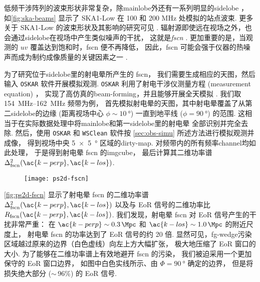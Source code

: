 低频干涉阵列的波束形状非常复杂，除\ac{mainlobe}外还有一系列明显的\ac{sidelobe}
\cite{noordam2004,wijnholds2010}，
如\autoref{fig:ska-beams} 显示了 SKA1-Low 在 100 和 200 MHz 处模拟的站点波束.
更多关于 SKA1-Low 的波束形状及其影响的研究可见 .
辐射源即使远在视场之外，也会通过\ac{sidelobe}在视场中产生类似噪声的干扰，
这就是\emph{\acf{fscn}} \cite{smirnov2012}.
更加重要的是，当观测的 $uv$ 覆盖达到饱和时，\ac{fscn} 便不再降低，
因此，\ac{fscn} 可能会强于仪器的热噪声而成为制约成像质量的关键因素之一 \cite{mort2017}.

为了研究位于\ac{sidelobe}里的射电晕所产生的 \ac{fscn}，
我们需要生成相应的天图，然后输入 \texttt{OSKAR} 软件开展模拟观测.
\texttt{OSKAR} 利用了射电干涉仪测量方程 (measurement equation) \cite{smirnov2011}，
实现了高仿真的\ac{beam-forming}，并且能够开展全天模拟 \cite{mort2010}.
我们取 \SIrange{154}{162}{\MHz} 频带为例，
首先模拟射电晕的天图，其中射电晕覆盖了从第二\ac{sidelobe}的边缘
(距离视场中心 $\phi \sim \SI{10}{\degree}$)
一直到地平线 ($\phi = \SI{90}{\degree}$) 的范围.
这相当于在实际数据处理中将\ac{mainlobe}和第一\ac{sidelobe}里的射电晕
全部识别并完全去除.
然后，使用 \texttt{OSKAR} 和 \texttt{WSClean} 软件按
\autoref{sec:obs-simu} 所述方法进行模拟观测并成像，
得到视场中央 \SI{5 x 5}{\degree} 区域的\ac{dirty-map}.
对频带内的所有频率\ac{channel}均如此处理，
于是得到射电晕 \ac{fscn} 的\ac{imgcube}，
最后计算其二维功率谱 $\Delta^2_{\R{fscn}}(\ac{k-perp}, \ac{k-los})$.

\begin{figure}[htp]
  \centering
  \texttt{[image: ps2d-fscn]}
  \label{fig:ps2d-fscn}
\end{figure}

\autoref{fig:ps2d-fscn} 显示了射电晕 \ac{fscn}
的二维功率谱 $\Delta^2_{\R{fscn}}(\ac{k-perp}, \ac{k-los})$
以及与 EoR 信号的二维功率比 $R_{\R{fscn}}(\ac{k-perp}, \ac{k-los})$.
我们发现，射电晕 \ac{fscn} 对 EoR 信号产生的干扰非常严重：
在 $\ac{k-perp} \sim \SI{0.3}{\per\Mpc}$ 
和 $\ac{k-los} \sim \SI{1.0}{\per\Mpc}$ 的附近尺度上，
射电晕 \ac{fscn} 的功率达到了 EoR 信号的约 20 倍.
显然可见，\ac{fg-wedge}污染区域越过原来的边界（白色虚线）向左上方大幅扩张，
极大地压缩了 EoR 窗口的大小.
为了能够在二维功率谱上有效地避开 \ac{fscn} 的污染，
我们被迫采用一个更加保守的 EoR 窗口边界，
如图中白色实线所示、由 $\Phi = \SI{90}{\degree}$ 确定的边界，
但是将损失绝大部分 ($\sim$\,96\%) 的 EoR 信号.

